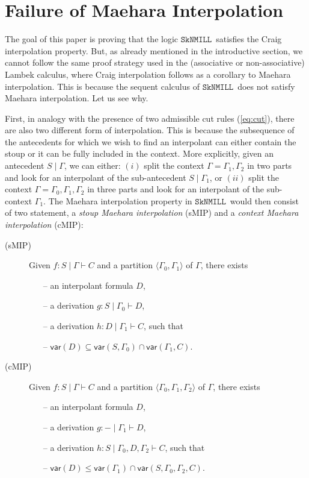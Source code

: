 \documentclass[sn-mathphys-num]{sn-jnl}%
\newcommand{\GG}{\Gamma}
\newcommand{\vd}{\vdash}
\newcommand{\SkNMILL}{$\mathtt{SkNMILL}$}
\newcommand{\mf}[1]{\mathsf{#1}}
\newcommand{\vars}[1]{\mf{var} (#1)}
\newcommand{\sMIP}{\textsf{sMIP}}
\newcommand{\cMIP}{\textsf{cMIP}}
\theoremstyle{thmstyleone}%
\theoremstyle{thmstyletwo}%
\theoremstyle{thmstylethree}%
\begin{document}
\section{Failure of Maehara Interpolation}\label{sec:failure}

The goal of this paper is proving that the logic \SkNMILL~satisfies the Craig interpolation property. But, as already mentioned in the introductive section, we cannot follow the same proof strategy used in the (associative or non-associative) Lambek calculus, where Craig interpolation follows as a corollary to Maehara interpolation. This is because the sequent calculus of \SkNMILL~does not satisfy Maehara interpolation. Let us see why.

First, in analogy with the presence of two admissible cut rules (\ref{eq:cut}), there are also two different form of interpolation. This is because the subsequence of the antecedents for which we wish to find an interpolant can either contain the stoup or it can be fully included in the context. More explicitly, given an antecedent $S \mid \GG$, we can either: $(i)$ split the context $\GG = \GG_1,\GG_2$ in two parts and look for an interpolant of the sub-antecedent $S \mid \GG_1$, or $(ii)$ split the context $\GG = \GG_0,\GG_1,\GG_2$ in three parts and look for an interpolant of the sub-context $\GG_1$.
The Maehara interpolation property in \SkNMILL~would then consist of two statement, a \emph{stoup Maehara interpolation} (\sMIP) and a \emph{context Maehara interpolation} (\cMIP):
\begin{description}
  \item[(\sMIP)] Given $f: S \mid \GG \vd C$ and a partition $\langle \GG_0,\GG_1 \rangle$ of $\GG$, there exists  
  \begin{itemize}
    \item[--] an interpolant formula $D$,
    \item[--] a derivation $g : S \mid \GG_0 \vd D$,
    \item[--] a derivation $h : D \mid \GG_1 \vd C$, such that
    \item[--] $\vars{D} \subseteq \vars{S , \GG_0} \cap \vars{\GG_1 , C}$.
  \end{itemize}
  \item[(\cMIP)] Given $f: S \mid \GG \vd C$ and a partition $\langle \GG_0,\GG_1, \GG_2 \rangle$ of $\GG$, there exists  
  \begin{itemize}
    \item[--] an interpolant formula $D$,
    \item[--] a derivation $g : {-} \mid \GG_1 \vd D$,
    \item[--] a derivation $h : S \mid \GG_0, D, \GG_2 \vd C$, such that
    \item[--] $\vars{D} \leq \vars{\GG_1} \cap \vars{S , \GG_0 , \GG_2 , C}$.    
  \end{itemize}
\end{description}
\end{document}
